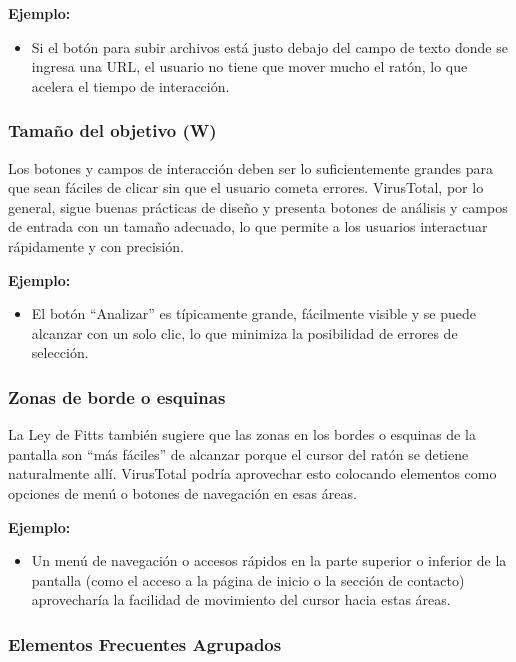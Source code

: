 	\textbf{Ejemplo:}

	\begin{itemize}
		\item Si el botón para subir archivos está justo debajo del campo
			de texto donde se ingresa una URL, el usuario no tiene que
			mover mucho el ratón, lo que acelera el tiempo de interacción.
	\end{itemize}

	\subsubsection{Tamaño del objetivo (W)}

	Los botones y campos de interacción deben ser lo suficientemente grandes
	para que sean fáciles de clicar sin que el usuario cometa errores.
	VirusTotal, por lo general, sigue buenas prácticas de diseño y
	presenta botones de análisis y campos de entrada con un tamaño
	adecuado, lo que permite a los usuarios interactuar rápidamente y con
	precisión.

	\textbf{Ejemplo:}

	\begin{itemize}
		\item El botón ``Analizar'' es típicamente grande, fácilmente
			visible y se puede alcanzar con un solo clic, lo que minimiza la
			posibilidad de errores de selección.
	\end{itemize}

	\subsubsection{Zonas de borde o esquinas}

	La Ley de Fitts también sugiere que las zonas en los bordes o esquinas
	de la pantalla son ``más fáciles'' de alcanzar porque el cursor del
	ratón se detiene naturalmente allí. VirusTotal podría aprovechar
	esto colocando elementos como opciones de menú o botones de
	navegación en esas áreas.

	\textbf{Ejemplo:}

	\begin{itemize}
		\item Un menú de navegación o accesos rápidos en la parte superior
			o inferior de la pantalla (como el acceso a la página de inicio
			o la sección de contacto) aprovecharía la facilidad de movimiento
			del cursor hacia estas áreas.
	\end{itemize}

	\subsubsection{Elementos Frecuentes Agrupados}

